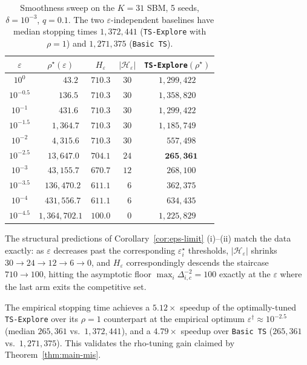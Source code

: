 \begin{table}[t]
\centering
\small
\caption{Smoothness sweep on the $K=31$ SBM, 5 seeds, $\delta=10^{-3}$,
$q=0.1$. The two $\varepsilon$-independent baselines have median
stopping times $1{,}372{,}441$ (\texttt{TS-Explore} with $\rho=1$) and
$1{,}271{,}375$ (\texttt{Basic TS}).}
\label{tab:exp-asymptotics}
\begin{tabular}{c c c c c}
\toprule
$\varepsilon$ & $\rho^\star(\varepsilon)$ & $H_\varepsilon$ &
$|\mathcal H_\varepsilon|$ & \texttt{TS-Explore}$(\rho^\star)$ \\
\midrule
$10^{0}$    & $\phantom{0\,000\,}43.2$       & $710.3$ & $30$ & $1{,}299{,}422$ \\
$10^{-0.5}$ & $\phantom{0\,00\,}136.5$       & $710.3$ & $30$ & $1{,}358{,}820$ \\
$10^{-1}$   & $\phantom{0\,00\,}431.6$       & $710.3$ & $30$ & $1{,}299{,}422$ \\
$10^{-1.5}$ & $\phantom{0\,0}1{,}364.7$      & $710.3$ & $30$ & $1{,}185{,}749$ \\
$10^{-2}$   & $\phantom{0\,0}4{,}315.6$      & $710.3$ & $30$ & $\phantom{0,}557{,}498$ \\
$10^{-2.5}$ & $\phantom{0\,}13{,}647.0$      & $704.1$ & $24$ & $\phantom{0,}\mathbf{265{,}361}$ \\
$10^{-3}$   & $\phantom{0\,}43{,}155.7$      & $670.7$ & $12$ & $\phantom{0,}268{,}100$ \\
$10^{-3.5}$ & $\phantom{0}136{,}470.2$       & $611.1$ & $\phantom{0}6$ & $\phantom{0,}362{,}375$ \\
$10^{-4}$   & $\phantom{0}431{,}556.7$       & $611.1$ & $\phantom{0}6$ & $\phantom{0,}634{,}435$ \\
$10^{-4.5}$ & $1{,}364{,}702.1$              & $100.0$ & $\phantom{0}0$ & $1{,}225{,}829$ \\
\bottomrule
\end{tabular}
\end{table}

The structural predictions of Corollary~\ref{cor:eps-limit} (i)--(ii) match
the data exactly: as $\varepsilon$ decreases past the corresponding
$\varepsilon_i^\star$ thresholds, $|\mathcal H_\varepsilon|$ shrinks
$30\to 24\to 12\to 6\to 0$, and $H_\varepsilon$ correspondingly descends
the staircase $710\to 100$, hitting the asymptotic floor
$\max_i\Delta_{i,c}^{-2}=100$ exactly at the $\varepsilon$ where the last
arm exits the competitive set.

The empirical stopping time achieves a $5.12\times$ speedup of the
optimally-tuned \texttt{TS-Explore} over its $\rho=1$ counterpart at the
empirical optimum $\varepsilon^\dagger\approx 10^{-2.5}$
(median $265{,}361$ vs.\ $1{,}372{,}441$), and a $4.79\times$ speedup over
\texttt{Basic TS} ($265{,}361$ vs.\ $1{,}271{,}375$). This validates the
rho-tuning gain claimed by Theorem~\ref{thm:main-mis}.


